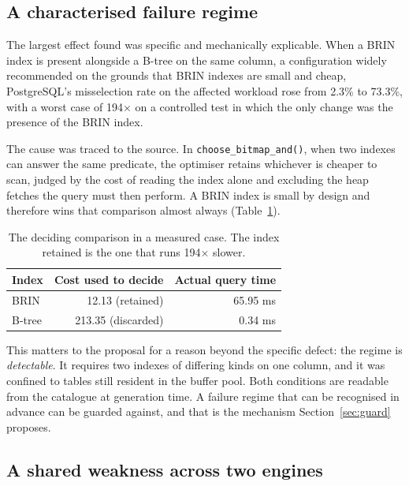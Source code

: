 \documentclass[12pt, a4paper]{article}
\begin{document}
\subsection{A characterised failure regime}

The largest effect found was specific and mechanically explicable. When
a BRIN index is present alongside a B-tree on the same column, a
configuration widely recommended on the grounds that BRIN indexes are
small and cheap, PostgreSQL's misselection rate on the affected
workload rose from 2.3\% to 73.3\%, with a worst case of 194$\times$ on
a controlled test in which the only change was the presence of the BRIN
index.

The cause was traced to the source. In \texttt{choose\_bitmap\_and()},
when two indexes can answer the same predicate, the optimiser retains
whichever is cheaper to scan, judged by the cost of reading the index
alone and excluding the heap fetches the query must then perform. A BRIN
index is small by design and therefore wins that comparison almost
always (Table~\ref{tab:brincause}).

\begin{table}[htbp]
\centering
\caption{The deciding comparison in a measured case. The index retained
is the one that runs 194$\times$ slower.}
\label{tab:brincause}
\small
\begin{tabular}{@{}lrr@{}}
\toprule
\textbf{Index} & \textbf{Cost used to decide} & \textbf{Actual query time} \\
\midrule
BRIN & 12.13 \quad (retained) & 65.95 ms \\
B-tree & 213.35 \quad (discarded) & 0.34 ms \\
\bottomrule
\end{tabular}
\end{table}

This matters to the proposal for a reason beyond the specific defect:
the regime is \emph{detectable}. It requires two indexes of differing
kinds on one column, and it was confined to tables still resident in the
buffer pool. Both conditions are readable from the catalogue at
generation time. A failure regime that can be recognised in advance can
be guarded against, and that is the mechanism
Section~\ref{sec:guard} proposes.

\subsection{A shared weakness across two engines}
\end{document}
